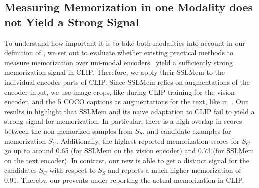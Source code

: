 \subsection{Measuring Memorization in one Modality does not Yield a Strong Signal}
\label{sub:sslmem_not_for_clip}
To understand how important it is to take both modalities into account in our definition of \ours, we set out to evaluate whether existing practical methods to measure memorization over uni-modal encoders~\citep{wang2024memorization} yield a sufficiently strong memorization signal in CLIP.
Therefore, we apply their SSLMem to the individual encoder parts of CLIP. Since SSLMem relies on augmentations of the encoder input, we use image crops, like during CLIP training for the vision encoder, and the 5 COCO captions as augmentations for the text, like in~\citep{fan2023}. 
Our results in  
highlight that SSLMem and its naive adaptation to CLIP fail to yield a strong signal for memorization. In particular, there is a high overlap in scores between the non-memorized samples from $S_S$, and candidate examples for memorization $S_C$. Additionally, the highest reported memorization scores for $S_C$ go up to around 0.65 (for SSLMem on the vision encoder) and 0.73 (for SSLMem on the text encoder). 
In contrast, our new \ours is able to get a distinct signal for the candidates $S_C$ with respect to $S_S$ and reports a much higher memorization of 0.91. Thereby, our \ours prevents under-reporting the actual memorization in CLIP.


